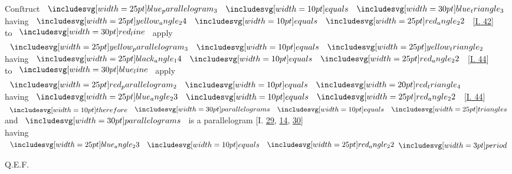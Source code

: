 \documentclass[12pt,preview]{standalone}
\begin{document}
\begin{minipage}[t]{0.64\textwidth}
    \begin{center}
        Conſtruct $\img{blue_parallelogram_3} \bequals \img[0][0][30]{blue_triangle_3}$\\
        having $\img{yellow_angle_24} \bequals \img{red_angle_22}$ [\hyperref[book1pr42]{\textsc{I.} 42}]\\
        to $\redline$ apply $\img{yellow_parallelogram_3} \bequals \img{yellow_triangle_2}$\\
        having $\img{black_angle_14} \bequals \img{red_angle_22}$ [\hyperref[book1pr44]{\textsc{I.} 44}]\\
        to $\blueline$ apply $\img{red_parallelogram_2} \bequals \img[0][0][20]{red_triangle_4}$\\
        having $\img{blue_angle_23} \bequals \img{red_angle_22}$ [\hyperref[book1pr44]{\textsc{I.} 44}]\\
        $\btherefore \img[0][0][30]{parallelograms} \bequals \img{triangles}$\\
        and $\img[0][0][30]{parallelograms}$ is a parallelogram [\textsc{I.} \hyperref[book1pr29]{29}, \hyperref[book1pr14]{14}, \hyperref[book1pr30]{30}]\\
        having $\img{blue_angle_23} \bequals \img{red_angle_22} \bperiod$
    \end{center}

    \hfill

    \hfill Q.E.F.
\end{minipage}
\end{document}
